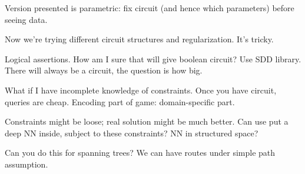 Version presented is parametric: fix circuit (and hence which parameters) before seeing data.

Now we're trying different circuit structures and regularization. It's tricky.

Logical assertions. How am I sure that will give boolean circuit? Use SDD library. There will always be a circuit, the question is how big.

What if I have incomplete knowledge of constraints. Once you have circuit, queries are cheap. Encoding part of game: domain-specific part.


Constraints might be loose; real solution might be much better. Can use put a deep NN inside, subject to these constraints? NN in structured space? %

Can you do this for spanning trees?
We can have routes under simple path assumption.